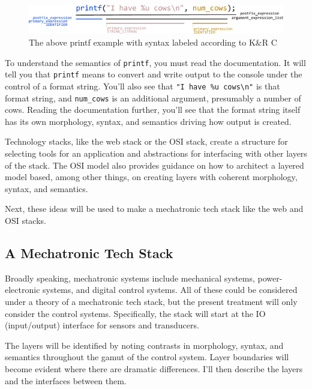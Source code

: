 \documentclass[english,12pt,a4paper,pdftex,eng,utf8]{aaltothesis}
\begin{document}
\begin{figure}[h]
  \centering
  \includegraphics[width=\textwidth]{assets/printf_syntax}
  \caption{The above printf example with syntax labeled according to K{\&}R C~\cite{Kernighan1978}}\label{fig:printf_syntax}
\end{figure}

To understand the semantics of \verb|printf|, you must read the documentation. It will tell you that \verb|printf| means to convert and write output to the console under the control of a format string. You'll also see that \verb|"I have %u cows\n"| is that format string, and \verb|num_cows| is an additional argument, presumably a number of cows. Reading the documentation further, you'll see that the format string itself has its own morphology, syntax, and semantics driving how output is created.

Technology stacks, like the web stack or the OSI stack, create a structure for selecting tools for an application and abstractions for interfacing with other layers of the stack. The OSI model also provides guidance on how to architect a layered model based, among other things, on creating layers with coherent morphology, syntax, and semantics.

Next, these ideas will be used to make a mechatronic tech stack like the web and OSI stacks.

\subsection{A Mechatronic Tech Stack}

Broadly speaking, mechatronic systems include mechanical systems, power-electronic systems, and digital control systems. All of these could be considered under a theory of a mechatronic tech stack, but the present treatment will only consider the control systems. Specifically, the stack will start at the IO (input/output) interface for sensors and transducers.

The layers will be identified by noting contrasts in morphology, syntax, and semantics throughout the gamut of the control system. Layer boundaries will become evident where there are dramatic differences. I'll then describe the layers and the interfaces between them.
\end{document}
